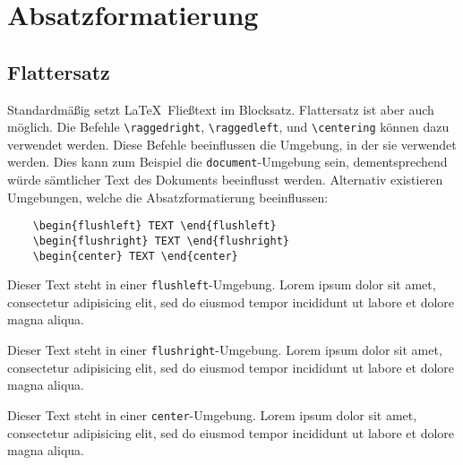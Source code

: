 \section{Absatzformatierung} %
\label{sec:absatzformatierung}

\subsection*{Flattersatz} %
\label{sub:flattersatz}
Standardmäßig setzt \LaTeX \ Fließtext im Blocksatz. Flattersatz ist aber auch möglich. Die Befehle \texttt{\textbackslash raggedright}, \texttt{\textbackslash raggedleft}, und \texttt{\textbackslash centering} können dazu verwendet werden. Diese Befehle beeinflussen die Umgebung, in der sie verwendet werden. Dies kann zum Beispiel die \texttt{document}-Umgebung sein, dementsprechend würde sämtlicher Text des Dokuments beeinflusst werden.
Alternativ existieren Umgebungen, welche die Absatzformatierung beeinflussen:
\begin{verbatim}
	\begin{flushleft} TEXT \end{flushleft}
	\begin{flushright} TEXT \end{flushright}
	\begin{center} TEXT \end{center}
\end{verbatim}
\begin{flushleft}
	Dieser Text steht in einer \texttt{flushleft}-Umgebung. Lorem ipsum dolor sit amet, consectetur adipisicing elit, sed do eiusmod tempor incididunt ut labore et dolore magna aliqua.
\end{flushleft}
\begin{flushright}
	Dieser Text steht in einer \texttt{flushright}-Umgebung. Lorem ipsum dolor sit amet, consectetur adipisicing elit, sed do eiusmod tempor incididunt ut labore et dolore magna aliqua.
\end{flushright}
\begin{center}
	Dieser Text steht in einer \texttt{center}-Umgebung. Lorem ipsum dolor sit amet, consectetur adipisicing elit, sed do eiusmod tempor incididunt ut labore et dolore magna aliqua.
\end{center}
